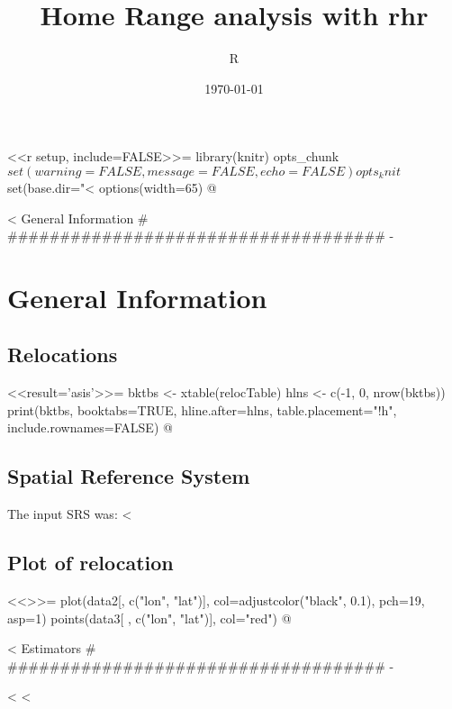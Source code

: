 \documentclass[a4,oneside,garamond,11.5pt]{scrreprt}
\author{R}
\date{\today}
\title{Home Range analysis with rhr}
\begin{document}
\maketitle
\tableofcontents


<<r setup, include=FALSE>>=
library(knitr)
opts_chunk$set(warning=FALSE, message=FALSE, echo=FALSE)
opts_knit$set(base.dir="<%
options(width=65)
@


<%
    General Information
  # #################################### -%

\chapter{General Information}
\section{Relocations}
<<result='asis'>>=
bktbs <- xtable(relocTable)
hlns <- c(-1, 0, nrow(bktbs))
print(bktbs, booktabs=TRUE, hline.after=hlns, table.placement="!h", include.rownames=FALSE)
@

\section{Spatial Reference System}
The input SRS was: <%

\section{Plot of relocation}

<<>>=
plot(data2[, c("lon", "lat")], col=adjustcolor("black", 0.1), pch=19, asp=1)
points(data3[ , c("lon", "lat")], col="red")
@


<%
    Estimators
  # #################################### -%

<%
<%
\end{document}
